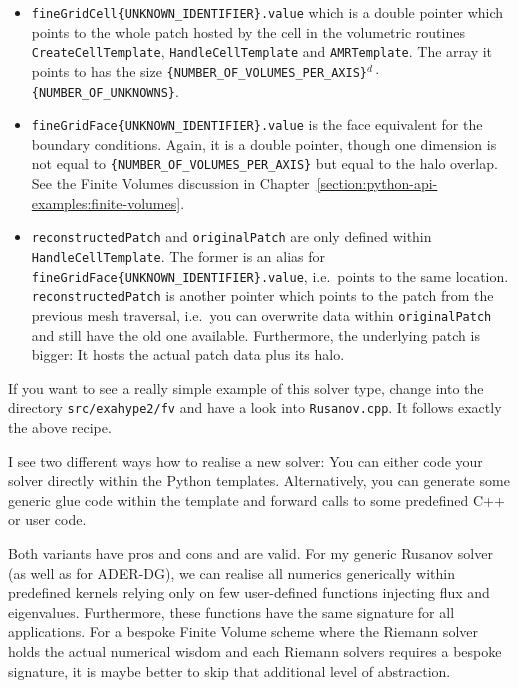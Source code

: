 \begin{itemize}
  \item \texttt{fineGridCell\{UNKNOWN\_IDENTIFIER\}.value} which is a double
    pointer which points to the whole patch hosted by the cell in the volumetric
    routines \texttt{CreateCellTemplate}, \texttt{HandleCellTemplate} and
    \texttt{AMRTemplate}. The array it points to has the size \linebreak
    \texttt{\{NUMBER\_OF\_VOLUMES\_PER\_AXIS\}}$^d \cdot $
    \texttt{\{NUMBER\_OF\_UNKNOWNS\}}.
  \item \texttt{fineGridFace\{UNKNOWN\_IDENTIFIER\}.value} is the face
    equivalent for the boundary conditions. Again, it is a double pointer,
    though one dimension is not equal to
    \texttt{\{NUMBER\_OF\_VOLUMES\_PER\_AXIS\}} but equal to the halo overlap.
    See the Finite Volumes discussion in
    Chapter~\ref{section:python-api-examples:finite-volumes}.
  \item \texttt{reconstructedPatch} and \texttt{originalPatch} are only defined
    within \texttt{HandleCellTemplate}. The former is an alias for
    \texttt{fineGridFace\{UNKNOWN\_IDENTIFIER\}.value}, i.e.~points to the same
    location. \texttt{reconstructedPatch} is another pointer which points to the
    patch from the previous mesh traversal, i.e.~you can overwrite data
    within \texttt{originalPatch} and still have the old one available.
    Furthermore, the underlying patch is bigger: It hosts the actual patch data
    plus its halo.
\end{itemize}




\begin{remark}
 If you want to see a really simple example of this solver type, change into the 
 directory \texttt{src/exahype2/fv} and have a look into \texttt{Rusanov.cpp}.
 It follows exactly the above recipe.
\end{remark}


\noindent
I see two different ways how to realise a new solver: 
You can either code your solver directly within the Python templates.
Alternatively, you can generate some generic glue code within the template and
forward calls to some predefined C++ or user code.


Both variants have pros and cons and are valid.
For my generic Rusanov solver (as well as for ADER-DG), we can realise all
numerics generically within predefined kernels relying only on few user-defined
functions injecting flux and eigenvalues.
Furthermore, these functions have the same signature for all applications.
For a bespoke Finite Volume scheme where the Riemann solver holds the actual
numerical wisdom and each Riemann solvers requires a bespoke signature, it is
maybe better to skip that additional level of abstraction.



